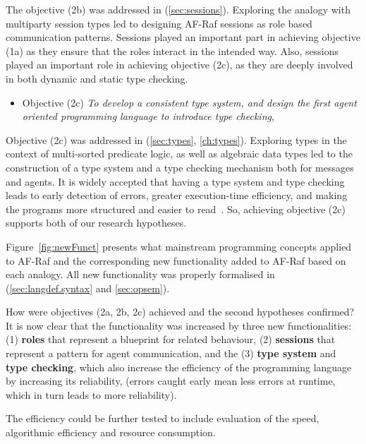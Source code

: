 \documentclass[a4paper,12pt,oneside,fleqn]{book} %
\begin{document}
The objective (2b) was addressed in (\autoref{sec:sessions}). Exploring
the analogy with multiparty session types led to designing AF-Raf sessions
as role based communication patterns. Sessions played an important part in
achieving objective (1a) as they ensure that the roles interact in the
intended way. Also, sessions played an important role in achieving
objective (2c), as they are deeply involved in both dynamic and static type
checking. 

\begin{itemize}
\item Objective (2c) \textit{To develop a consistent type system,
    and design the first agent oriented programming language to introduce
  type checking}, 
  
\end{itemize}
Objective (2c) was addressed in (\autoref{sec:types}, \autoref{ch:types}).
Exploring types in the context of multi-sorted predicate logic, as well as
algebraic data types led to the construction of a type system and a type
checking mechanism both for messages and agents. It is widely accepted that
having a type system and type checking leads to early detection of errors,
greater execution-time efficiency, and making the programs more structured
and easier to read~\cite{DBLP:journals/csur/CardelliW85}. So, achieving
objective (2c) supports both of our research hypotheses.

Figure~\ref{fig:newFunct} presents what mainstream programming concepts
applied to AF-Raf and the corresponding new functionality added to AF-Raf
based on each analogy. All new functionality was properly formalised in
(\autoref{sec:langdef.syntax} and \autoref{sec:opsem}).

How were objectives (2a, 2b, 2c) achieved and the second hypotheses
confirmed? It is now clear that the functionality was increased by three
new functionalities: (1) \textbf{roles} that represent a blueprint for
related behaviour, (2) \textbf{sessions} that represent a pattern for agent
communication, and the (3) \textbf{type system} and \textbf{type checking},
which also increase the efficiency of the programming language by
increasing its reliability, (errors caught early mean less errors at
runtime, which in turn leads to more reliability).

The efficiency could be further tested to include evaluation of the speed,
algorithmic efficiency and resource consumption.
\end{document}
